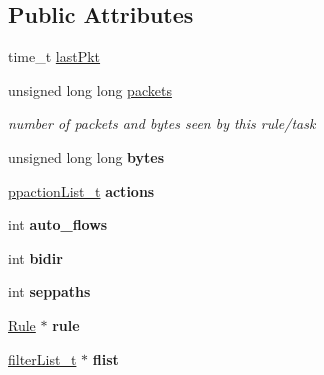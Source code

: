 \subsection*{Public Attributes}
\begin{DoxyCompactItemize}
\item 
time\+\_\+t \hyperlink{structruleActions__t_ab5d6b8c4bc751e5db10186fdb6d7757f}{last\+Pkt}
\item 
\mbox{\label{structruleActions__t_ae05927277834557d602b60bb61d59528}} 
unsigned long long \hyperlink{structruleActions__t_ae05927277834557d602b60bb61d59528}{packets}
\begin{DoxyCompactList}\small\item\em number of packets and bytes seen by this rule/task \end{DoxyCompactList}\item 
\mbox{\label{structruleActions__t_a077726e7d244280e177c7c3c5365787c}} 
unsigned long long {\bfseries bytes}
\item 
\mbox{\label{structruleActions__t_a8c9d9225770b1beeb2aed2b1a5c1dd97}} 
\hyperlink{QOSProcessor_8h_ae32981e3c7557573d2a6a8f1694c3e5f}{ppaction\+List\+\_\+t} {\bfseries actions}
\item 
\mbox{\label{structruleActions__t_a94de4fb69b43a5f3ca25eaefb67dbd53}} 
int {\bfseries auto\+\_\+flows}
\item 
\mbox{\label{structruleActions__t_af377e0b9445f20822e3a66a2e59940bc}} 
int {\bfseries bidir}
\item 
\mbox{\label{structruleActions__t_ad900355420b0afe0b4beb3a824c48c56}} 
int {\bfseries seppaths}
\item 
\mbox{\label{structruleActions__t_a4dd9a5c819dc8674697d6497adce29a8}} 
\hyperlink{classRule}{Rule} $\ast$ {\bfseries rule}
\item 
\mbox{\label{structruleActions__t_a5bb1477b49fa6cb59c6a25e0eb2d1ab6}} 
\hyperlink{ProcModuleInterface_8h_a2afc1e9fc63b2cfcd86ec2435f24e27c}{filter\+List\+\_\+t} $\ast$ {\bfseries flist}
\end{DoxyCompactItemize}


